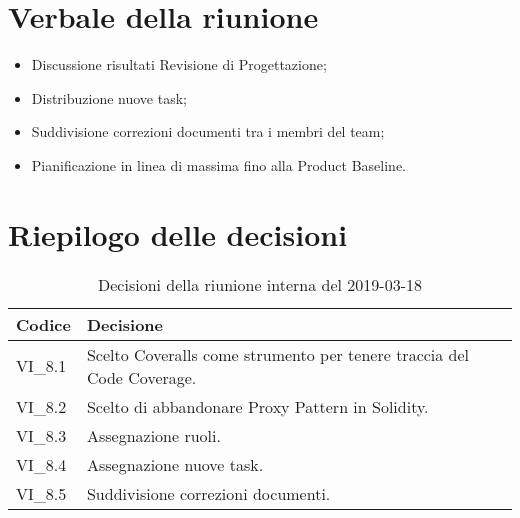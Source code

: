 \section{Verbale della riunione}
\begin{itemize}
	\item Discussione risultati Revisione di Progettazione;
	\item Distribuzione nuove task;
	\item Suddivisione correzioni documenti tra i membri del team;
	\item Pianificazione in linea di massima fino alla Product Baseline.
	
\end{itemize}

\hspace{3cm}

\section{Riepilogo delle decisioni}

	
	\begin{longtable}{ >{\centering}p{} >{}p{}}
		\caption{Decisioni della riunione interna del 2019-03-18}\\	
		\rowcolorhead
		\textbf{\color{white}Codice} 
		& \centering\textbf{\color{white}Decisione} 
		\tabularnewline 
		\endfirsthead
		VI\_8.1 & Scelto Coveralls come strumento per tenere traccia del Code Coverage.
		\tabularnewline 
		VI\_8.2 & Scelto di abbandonare Proxy Pattern in Solidity.
		\tabularnewline 
		VI\_8.3 & Assegnazione ruoli.
		\tabularnewline 
		VI\_8.4 & Assegnazione nuove task.
		\tabularnewline
		VI\_8.5 & Suddivisione correzioni documenti.\\
		
	\end{longtable}
	




